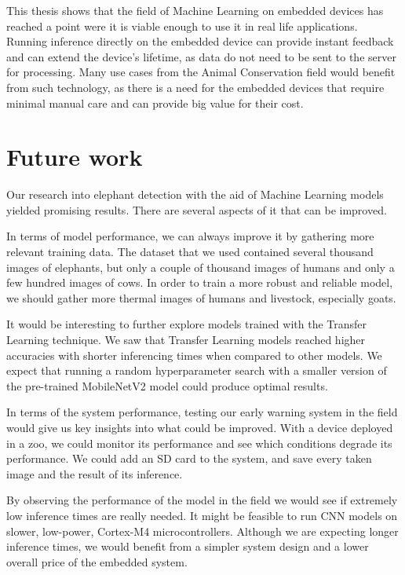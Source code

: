 This thesis shows that the field of Machine Learning on embedded devices has reached a point were it is viable enough to use it in real life applications.
Running inference directly on the embedded device can provide instant feedback and can extend the device's lifetime, as data do not need to be sent to the server for processing.
Many use cases from the Animal Conservation field would benefit from such technology, as there is a need for the embedded devices that require minimal manual care and can provide big value for their cost.


\section{ Future work}

Our research into elephant detection with the aid of Machine Learning models yielded promising results.
There are several aspects of it that can be improved.

In terms of model performance, we can always improve it by gathering more relevant training data.
The dataset that we used contained several thousand images of elephants, but only a couple of thousand images of humans and only a few hundred images of cows.
In order to train a more robust and reliable model, we should gather more thermal images of humans and livestock, especially goats.

It would be interesting to further explore models trained with the Transfer Learning technique.
We saw that Transfer Learning models reached higher accuracies with shorter inferencing times when compared to other models.
We expect that running a random hyperparameter search with a smaller version of the pre-trained MobileNetV2 model could produce optimal results.

In terms of the system performance, testing our early warning system in the field would give us key insights into what could be improved.
With a device deployed in a zoo, we could monitor its performance and see which conditions degrade its performance.
We could add an SD card to the system, and save every taken image and the result of its inference.

By observing the performance of the model in the field we would see if extremely low inference times are really needed.
It might be feasible to run CNN models on slower, low-power, Cortex-M4 microcontrollers.
Although we are expecting longer inference times, we would benefit from a simpler system design and a lower overall price of the embedded system.

